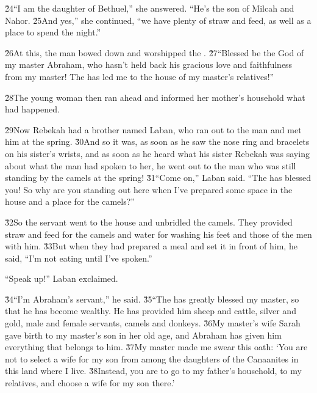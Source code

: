 \v{24}``I am the daughter of Bethuel,'' she answered. ``He's the son of Milcah and Nahor. \v{25}And yes,'' she continued, ``we have plenty of straw and feed, as well as a place to spend the night.''

\v{26}At this, the man bowed down and worshipped the . \v{27}``Blessed be the  God of my master Abraham, who hasn't held back his gracious love and faithfulness from my master! The  has led me to the house of my master's relatives!''

\v{28}The young woman then ran ahead and informed her mother's household what had happened.

\v{29}Now Rebekah had a brother named Laban, who ran out to the man and met him at the spring. \v{30}And so it was, as soon as he saw the nose ring and bracelets on his sister's wrists, and as soon as he heard what his sister Rebekah was saying about what the man had spoken to her, he went out to the man who was still standing by the camels at the spring! \v{31}``Come on,'' Laban said. ``The  has blessed you! So why are you standing out here when I've prepared some space in the house and a place for the camels?''

\v{32}So the servant went to the house and unbridled the camels. They provided straw and feed for the camels and water for washing his feet and those of the men with him. \v{33}But when they had prepared a meal and set it in front of him, he said, ``I'm not eating until I've spoken.''

``Speak up!'' Laban exclaimed.

\v{34}``I'm Abraham's servant,'' he said. \v{35}``The  has greatly blessed my master, so that he has become wealthy. He has provided him sheep and cattle, silver and gold, male and female servants, camels and donkeys. \v{36}My master's wife Sarah gave birth to my master's son in her old age, and Abraham has given him everything that belongs to him. \v{37}My master made me swear this oath: `You are not to select a wife for my son from among the daughters of the Canaanites in this land where I live. \v{38}Instead, you are to go to my father's household, to my relatives, and choose a wife for my son there.'

